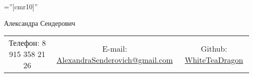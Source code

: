 \documentclass[a4paper,10pt]{article}
\begin{document}

\pagestyle{empty} %

\font\fb=''[cmr10]'' %

\par{\centering
		{\Huge Александра Сендерович
	}\bigskip\par}


\begin{center}
\begin{tabular}{c c c}
     Телефон: 8 915 358 21 26 & E-mail: \href{mailto:alexandrasenderovich@gmail.com}{AlexandraSenderovich@gmail.com} & Github: \href{https://github.com/WhiteTeaDragon}{WhiteTeaDragon}
\end{tabular}
\end{center}

\end{document}
